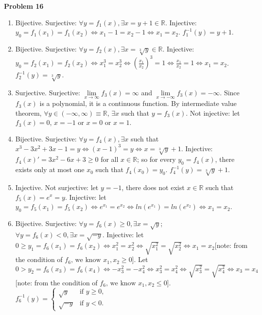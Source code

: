\documentclass{article}
\begin{document}
\textbf{Problem 16}
\begin{enumerate}[label={(\roman*)}]
    \item Bijective. Surjective: $\forall y=f_1(x), \exists x = y +1\in \mathbb{R}$. Injective: $y_0=f_1(x_1)=f_1(x_2)\Leftrightarrow x_1-1=x_2-1\Leftrightarrow x_1=x_2$. $f_1^{-1}(y)=y+1$.
    \item Bijective. Surjective: $\forall y=f_2(x), \exists x = \sqrt[3]{y}\in \mathbb{R}$. Injective: $y_0=f_2(x_1)=f_2(x_2)\Leftrightarrow x_1^3=x_2^3\Leftrightarrow \left(\frac{x_1}{x_2}\right)^3=1\Leftrightarrow \frac{x_1}{x_2}=1\Leftrightarrow x_1=x_2$. $f_2^{-1}(y)=\sqrt[3]{y}$.
    \item Surjective. Surjective: $\lim\limits_{x\rightarrow \infty}f_3(x)=\infty$ and $\lim\limits_{x\rightarrow -\infty}f_3(x)=-\infty$. Since $f_3(x)$ is a polynomial, it is a continuous function. By intermediate value theorem, $\forall y  \in (-\infty,\infty)\equiv \mathbb{R}$, $\exists x$ such that $y=f_3(x)$. Not injective: let $f_3(x)=0$, $x=-1$ or $x=0$ or $x=1$. 
    \item Bijective. Surjective: $\forall y=f_4(x), \exists x$ such that $x^3-3x^2+3x-1=y \Leftrightarrow (x-1)^3=y \Leftrightarrow x=\sqrt[3]{y}+1$. Injective: $f_4(x)'=3x^2-6x+3\ge 0$ for all $x\in \mathbb{R}$; so for every $y_0=f_4(x)$, there exists only at most one $x_0$ such that $f_4(x_0)=y_0$. $f_4^{-1}(y)=\sqrt[3]{y}+1$. 
    \item Injective. Not surjective: let $y=-1$, there does not exist $x\in \mathbb{R}$ such that $f_5(x)=e^x=y$. Injective: let $y_0=f_5(x_1)=f_5(x_2)\Leftrightarrow e^{x_1}=e^{x_2}\Leftrightarrow ln(e^{x_1})=ln(e^{x_2})\Leftrightarrow x_1=x_2$.
    \item Bijective. Surjective: $\forall y = f_6(x) \ge 0, \exists x=\sqrt{y}$; $\forall y=f_6(x)<0,\exists x=\sqrt{-y}$. 
    Injective: let $0\ge y_1=f_6(x_1)=f_6(x_2)\Leftrightarrow x_1^2=x_2^2\Leftrightarrow\sqrt{x_1^2}=\sqrt{x_2^2}\Leftrightarrow x_1=x_2$[note: from the condition of $f_6\text{, we know }x_1,x_2\ge 0$]. 
    Let $0>y_2=f_6(x_3)=f_6(x_4)\Leftrightarrow -x_3^2=-x_4^2\Leftrightarrow x_3^2=x_4^2\Leftrightarrow\sqrt{x_3^2}=\sqrt{x_4^2}\Leftrightarrow x_3=x_4$[note: from the condition of $f_6\text{, we know }x_1,x_2\le 0$]. 
    $f_6^{-1}(y)=\begin{cases}
        \sqrt{y} & \text{if }y\ge 0,\\
        \sqrt{-y} & \text{if }y<0.
    \end{cases}$
\end{enumerate}
\end{document}
